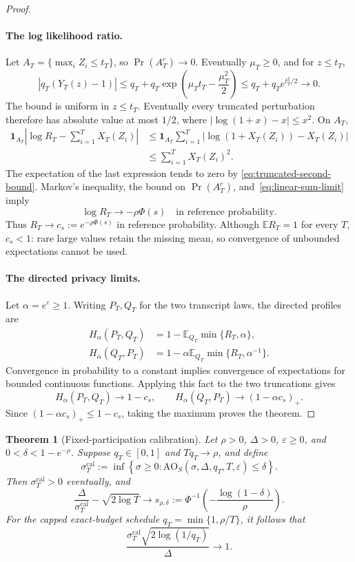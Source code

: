 \documentclass[11pt]{article}
\newtheorem{theorem}{Theorem}[section]
\theoremstyle{remark}
\newcommand{\E}{\mathbb E}
\newcommand{\AO}{\mathrm{AO}}
\begin{document}
\begin{proof}
\paragraph{The log likelihood ratio.}
Let $A_T=\{\max_i Z_i\leq t_T\}$, so $\Pr(A_T^c)\to0$.
Eventually $\mu_T\geq0$, and for $z\leq t_T$,
\[
 |q_T(Y_T(z)-1)|
 \leq q_T+q_T\exp\left(\mu_Tt_T-\frac{\mu_T^2}{2}\right)
 \leq q_T+q_Te^{t_T^2/2}\longrightarrow0.
\]
The bound is uniform in $z\leq t_T$. Eventually every truncated perturbation
therefore has absolute value at most $1/2$, where
$|\log(1+x)-x|\leq x^2$. On $A_T$,
\begin{align*}
 \mathbf1_{A_T}\left|\log R_T-\sum_{i=1}^T X_T(Z_i)\right|
 &\leq\mathbf1_{A_T}\sum_{i=1}^T
   |\log(1+X_T(Z_i))-X_T(Z_i)|\\
 &\leq\sum_{i=1}^T X_T(Z_i)^2.
\end{align*}
The expectation of the last expression tends to zero by
\eqref{eq:truncated-second-bound}. Markov's inequality, the bound on
$\Pr(A_T^c)$, and~\eqref{eq:linear-sum-limit} imply
\begin{equation}\label{eq:log-likelihood-limit}
 \log R_T\longrightarrow-\rho\Phi(s)
 \quad\text{in reference probability}.
\end{equation}
Thus $R_T\to c_s:=e^{-\rho\Phi(s)}$ in reference probability.
Although $\E R_T=1$ for every $T$, $c_s<1$: rare large values retain the
missing mean, so convergence of unbounded expectations cannot be used.

\paragraph{The directed privacy limits.}
Let $\alpha=e^\varepsilon\geq1$. Writing $P_T,Q_T$ for the two transcript
laws, the directed profiles are
\begin{align*}
 H_\alpha(P_T, Q_T)&=1-\E_{Q_T}\min\{R_T,\alpha\},\\
 H_\alpha(Q_T, P_T)&=1-\alpha\E_{Q_T}\min\{R_T,\alpha^{-1}\}.
\end{align*}
Convergence in probability to a constant implies convergence of expectations
for bounded continuous functions. Applying this fact to the two truncations
gives
\[
 H_\alpha(P_T, Q_T)\to1-c_s,\qquad
 H_\alpha(Q_T, P_T)\to(1-\alpha c_s)_+.
\]
Since $(1-\alpha c_s)_+\leq1-c_s$, taking the maximum proves the theorem.
\end{proof}

\begin{theorem}[Fixed-participation calibration]
\label{thm:fixed-participation-calibration}
Let $\rho>0$, $\Delta>0$, $\varepsilon\geq0$, and
$0<\delta<1-e^{-\rho}$. Suppose $q_T\in[0,1]$ and $Tq_T\to\rho$, and define
\[
 \sigma_T^{\mathrm{cal}}:=\inf\left\{\sigma\geq0:
 \AO_S(\sigma,\Delta,q_T,T,\varepsilon)\leq\delta\right\}.
\]
Then $\sigma_T^{\mathrm{cal}}>0$ eventually, and
\[
 \frac{\Delta}{\sigma_T^{\mathrm{cal}}}-\sqrt{2\log T}
 \longrightarrow s_{\rho,\delta}:=
 \Phi^{-1}\!\left(-\frac{\log(1-\delta)}\rho\right).
\]
For the capped exact-budget schedule $q_T=\min\{1,\rho/T\}$, it follows that
\[
 \frac{\sigma_T^{\mathrm{cal}}\sqrt{2\log(1/q_T)}}\Delta\longrightarrow1.
\]
\end{theorem}
\end{document}
